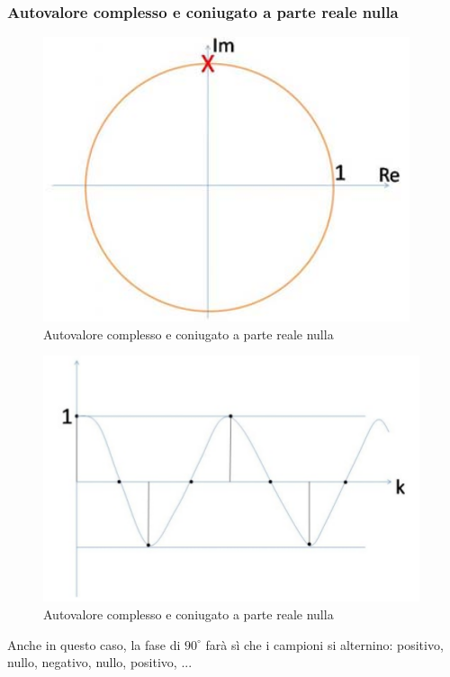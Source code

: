 \documentclass[a4paper]{report}
\begin{document}
\subsubsection{Autovalore complesso e coniugato a parte reale nulla}
\begin{figure}[!h]
  \begin{center}
    \includegraphics[scale=0.3]{./figures/autovaloreComplessoConiugatoRealeNullaCirconferenza00.png}
    \caption{Autovalore complesso e coniugato a parte reale
      nulla}\label{fig:autovaloreComplessoConiugatoRealeNullaCirconferenza00.png}
  \end{center}
\end{figure}
\begin{figure}[!h]
  \begin{center}
    \includegraphics[scale=0.3]{./figures/autovaloreComplessoConiugatoRealeNullaCirconferenza01.png}
    \caption{Autovalore complesso e coniugato a parte reale
      nulla}\label{fig:autovaloreComplessoConiugatoRealeNullaCirconferenza01.png}
  \end{center}
\end{figure}
Anche in questo caso, la fase di $90^{\circ}$ far\`a s\`i che i
campioni si alternino: positivo, nullo, negativo, nullo, positivo, ...
\end{document}
